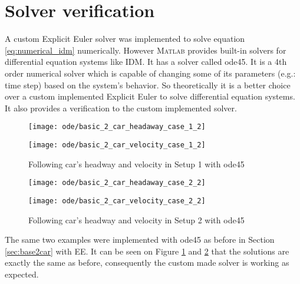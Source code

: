 	\section{Solver verification}
		A custom Explicit Euler solver was implemented to solve equation \ref{eq:numerical_idm} numerically. However \textsc{Matlab} provides built-in solvers for differential equation systems like IDM. It has a solver called ode45. It is a 4th order numerical solver which is capable of changing some of its parameters (e.g.: time step) based on the system's behavior. So theoretically it is a better choice over a custom implemented Explicit Euler to solve differential equation systems. It also provides a verification to the custom implemented solver. 
		\begin{figure}[ht]
			\centering
			\begin{minipage}{.5\textwidth}
				\centering
				\texttt{[image: ode/basic\_2\_car\_headaway\_case\_1\_2]}
			\end{minipage}\hfill
			\begin{minipage}{.5\textwidth}
				\centering
				\texttt{[image: ode/basic\_2\_car\_velocity\_case\_1\_2]}
			\end{minipage}
			\caption{Following car's headway and velocity in Setup 1 with ode45}
			\label{fig:basic2car_case_1_ode}
		\end{figure}
		\begin{figure}[ht]
			\centering
			\begin{minipage}{.5\textwidth}
				\centering
				\texttt{[image: ode/basic\_2\_car\_headaway\_case\_2\_2]}
			\end{minipage}\hfill
			\begin{minipage}{.5\textwidth}
				\centering
				\texttt{[image: ode/basic\_2\_car\_velocity\_case\_2\_2]}
			\end{minipage}
			\caption{Following car's headway and velocity in Setup 2  with ode45}
			\label{fig:basic2car_case_2_ode}
		\end{figure}

		The same two examples were implemented with ode45 as before in Section \ref{sec:base2car} with EE.
		It can be seen on Figure \ref{fig:basic2car_case_1_ode} and \ref{fig:basic2car_case_2_ode} that the solutions are exactly the same as before, consequently the custom made solver is working as expected.
